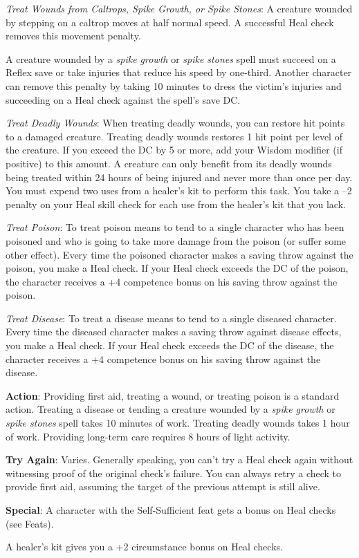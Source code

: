 \textit{Treat Wounds from Caltrops, Spike Growth, or Spike Stones}: A creature wounded by stepping on a caltrop moves at half normal speed. A successful Heal check removes this movement penalty.
				
A creature wounded by a \textit{spike growth} or \textit{spike stones} spell must succeed on a Reflex save or take injuries that reduce his speed by one-third. Another character can remove this penalty by taking 10 minutes to dress the victim's injuries and succeeding on a Heal check against the spell's save DC.
				
\textit{Treat Deadly Wounds}: When treating deadly wounds, you can restore hit points to a damaged creature. Treating deadly wounds restores 1 hit point per level of the creature. If you exceed the DC by 5 or more, add your Wisdom modifier (if positive) to this amount. A creature can only benefit from its deadly wounds being treated within 24 hours of being injured and never more than once per day. You must expend two uses from a healer's kit to perform this task. You take a --2 penalty on your Heal skill check for each use from the healer's kit that you lack.
				
\textit{Treat Poison}: To treat poison means to tend to a single character who has been poisoned and who is going to take more damage from the poison (or suffer some other effect). Every time the poisoned character makes a saving throw against the poison, you make a Heal check. If your Heal check exceeds the DC of the poison, the character receives a +4 competence bonus on his saving throw against the poison.
				
\textit{Treat Disease}: To treat a disease means to tend to a single diseased character. Every time the diseased character makes a saving throw against disease effects, you make a Heal check. If your Heal check exceeds the DC of the disease, the character receives a +4 competence bonus on his saving throw against the disease.
				
\textbf{Action}: Providing first aid, treating a wound, or treating poison is a standard action. Treating a disease or tending a creature wounded by a \textit{spike growth} or \textit{spike stones} spell takes 10 minutes of work. Treating deadly wounds takes 1 hour of work. Providing long-term care requires 8 hours of light activity.
				
\textbf{Try Again}: Varies. Generally speaking, you can't try a Heal check again without witnessing proof of the original check's failure. You can always retry a check to provide first aid, assuming the target of the previous attempt is still alive.
				
\textbf{Special}: A character with the Self-Sufficient feat gets a bonus on Heal checks (see Feats).
				
A healer's kit gives you a +2 circumstance bonus on Heal checks.
        	

